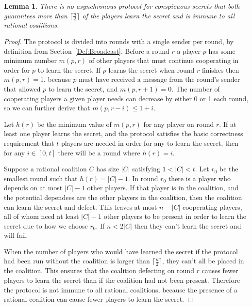 \documentclass{dalcsthesis}
\newtheorem{lemma}{Lemma}
\begin{document}
\begin{lemma}\label{Lem:Async:NoConspGoodRatImmune}There is no asynchronous protocol for conspicuous secrets that both guarantees more than $\lceil \frac{n}{2} \rceil$ of the players learn the secret and is immune to all rational coalitions.\end{lemma}
\begin{proof}
The protocol is divided into rounds with a single sender per round, by definition from Section~\ref{Def:Broadcast}. Before a round $r$ a player $p$ has some minimum number $m(p, r)$ of other players that must continue cooperating in order for $p$ to learn the secret. If $p$ learns the secret when round $r$ finishes then $m(p, r) = 1$, because $p$ must have received a message from the round's sender that allowed $p$ to learn the secret, and $m(p, r+1) = 0$. The number of cooperating players a given player needs can decrease by either 0 or 1 each round, so we can further derive that $m(p, r-i) \leq 1+i$.

Let $h(r)$ be the minimum value of $m(p, r)$ for any player on round $r$. If at least one player learns the secret, and the protocol satisfies the basic correctness requirement that $t$ players are needed in order for any to learn the secret, then for any $i \in [0, t]$ there will be a round where $h(r) = i$.

Suppose a rational coalition $C$ has size $|C|$ satisfying $1 < |C| < t$. Let $r_0$ be the smallest round such that $h(r) = |C|-1$. In round $r_0$ there is a player who depends on at most $|C|-1$ other players. If that player is in the coalition, and the potential dependees are the other players in the coalition, then the coalition can learn the secret and defect. This leaves at most $n-|C|$ cooperating players, all of whom need at least $|C|-1$ other players to be present in order to learn the secret due to how we choose $r_0$. If $n < 2 |C|$ then they can't learn the secret and will fail.

When the number of players who would have learned the secret if the protocol had been run without the coalition is larger than $\lceil \frac{n}{2} \rceil$, they can't all be placed in the coalition. This ensures that the coalition defecting on round $r$ causes fewer players to learn the secret than if the coalition had not been present. Therefore the protocol is not immune to all rational coalitions, because the presence of a rational coalition can cause fewer players to learn the secret.
\end{proof}
\end{document}
